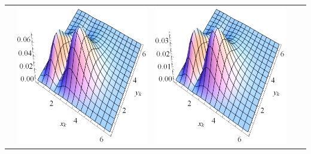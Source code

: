 \documentclass[12pt,a4paper,twoside]{article}
\begin{document}
\begin{table}[]
\begin{tabular}{@{}ccccc@{}}
&\includegraphics[scale=0.5]{W1_2}         
&\includegraphics[scale=0.5]{W1_3}         

\end{tabular}
\end{table}
\end{document}
